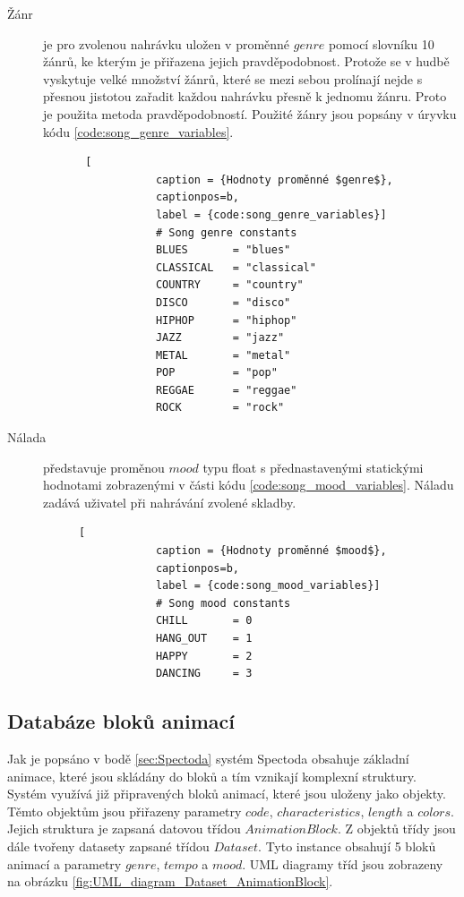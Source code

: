 \begin{description}
    \item[Žánr] je pro zvolenou nahrávku uložen v proměnné $genre$ pomocí slovníku 10 žánrů, ke kterým je přiřazena jejich pravděpodobnost. Protože se v hudbě vyskytuje velké množství žánrů, které se mezi sebou prolínají nejde s přesnou jistotou zařadit každou nahrávku přesně k jednomu žánru. Proto je použita metoda pravděpodobností. Použité žánry jsou popsány v úryvku kódu \ref{code:song_genre_variables}.
    \begin{figure}[H]
        \begin{lstlisting} [
            caption = {Hodnoty proměnné $genre$},
            captionpos=b,
            label = {code:song_genre_variables}]
            # Song genre constants
            BLUES       = "blues"
            CLASSICAL   = "classical"
            COUNTRY     = "country"
            DISCO       = "disco"
            HIPHOP      = "hiphop"
            JAZZ        = "jazz"
            METAL       = "metal"
            POP         = "pop"
            REGGAE      = "reggae"
            ROCK        = "rock"
        \end{lstlisting}
    \end{figure}

    \item[Nálada] představuje proměnou $mood$ typu float s přednastavenými statickými hodnotami zobrazenými v části kódu \ref{code:song_mood_variables}. Náladu zadává uživatel při nahrávání zvolené skladby.  
    \begin{figure}[H]        
        \begin{lstlisting}[
            caption = {Hodnoty proměnné $mood$},
            captionpos=b,
            label = {code:song_mood_variables}]
            # Song mood constants
            CHILL       = 0
            HANG_OUT    = 1
            HAPPY       = 2
            DANCING     = 3
        \end{lstlisting}
    \end{figure}
    
\end{description}

\subsection{Databáze bloků animací} \label{sec:Database_structure}
Jak je popsáno v bodě \ref{sec:Spectoda} systém Spectoda obsahuje základní animace, které jsou skládány do bloků a tím vznikají komplexní struktury. Systém využívá již připravených bloků animací, které jsou uloženy jako objekty. Těmto objektům jsou přiřazeny parametry $code$, $characteristics$, $length$ a $colors$. Jejich struktura je zapsaná datovou třídou $AnimationBlock$. Z objektů třídy jsou dále tvořeny datasety zapsané třídou $Dataset$. Tyto instance obsahují 5 bloků animací a parametry $genre$, $tempo$ a $mood$. UML diagramy tříd jsou zobrazeny na obrázku \ref{fig:UML_diagram_Dataset_AnimationBlock}.

